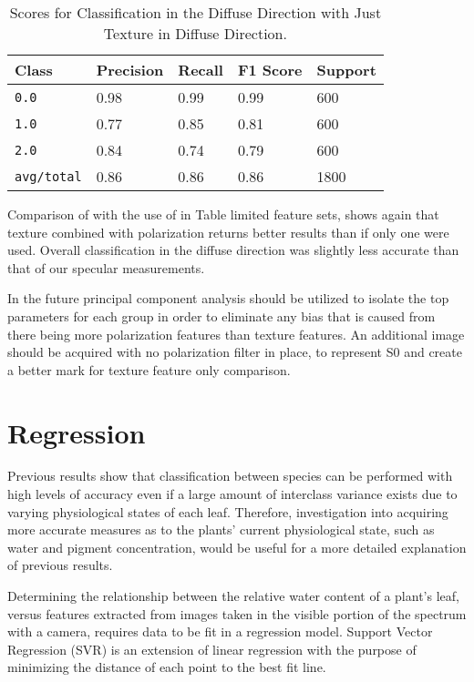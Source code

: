 %
\begin{table}[htb]
  \centering
  \begin{tabular}{lllll}
    \toprule
    \textbf{Class} & \textbf{Precision} & \textbf{Recall} & \textbf{F1 Score} & Support\\
    \midrule
      \texttt{0.0} & 0.98 & 0.99 & 0.99 & 600 \\
      \texttt{1.0} & 0.77 & 0.85 & 0.81 & 600 \\
      \texttt{2.0} & 0.84 & 0.74 & 0.79 & 600 \\
      \texttt{avg/total} & 0.86 & 0.86 & 0.86 & 1800 \\
    \bottomrule
  \end{tabular}
  \caption{%
    Scores for Classification in the Diffuse Direction with Just Texture in Diffuse Direction.
  }
  \label{tab:Packages}
\end{table}
%
Comparison of with the use of in Table limited feature sets, shows again that texture combined with polarization returns better results than if only one were used.  Overall classification in the diffuse direction was slightly less accurate than that of our specular measurements.

In the future principal component analysis should be utilized to isolate the top parameters for each group in order to eliminate any bias that is caused from there being more polarization features than texture features. An additional image should be acquired with no polarization filter in place, to represent S0 and create a better mark for texture feature only comparison.

\section{Regression}
Previous results show that classification between species can be performed with high levels of accuracy even if a large amount of interclass variance exists due to varying physiological states of each leaf.  Therefore, investigation into acquiring more accurate measures as to the plants' current physiological state, such as water and pigment concentration, would be useful for a more detailed explanation of previous results.

Determining the relationship between the relative water content of a plant's leaf, versus features extracted from images taken in the visible portion of the spectrum with a camera, requires data to be fit in a regression model.  Support Vector Regression (SVR) is an extension of linear regression with the purpose of minimizing the distance of each point to the best fit line.

